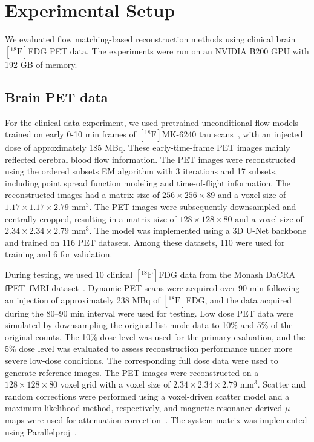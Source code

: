 \documentclass[journal]{IEEEtran}
\begin{document}
\section{Experimental Setup}

We evaluated flow matching-based reconstruction methods using clinical brain $[^{18}\mathrm{F}]$FDG PET data. The experiments were run on an NVIDIA B200 GPU with 192 GB of memory.

\subsection{Brain PET data}
For the clinical data experiment, we used pretrained unconditional flow models trained on early 0-10 min frames of $[^{18}\mathrm{F}]$MK-6240 tau scans~\cite{Gong2024DDPM}, with an injected dose of approximately 185 MBq. These early-time-frame PET images mainly reflected cerebral blood flow information. The PET images were reconstructed using the ordered subsets EM algorithm with 3 iterations and 17 subsets, including point spread function modeling and time-of-flight information. The reconstructed images had a matrix size of $256 \times 256 \times 89$ and a voxel size of $ 1.17  \times 1.17 \times 2.79 $ mm$^3$. The PET images were subsequently downsampled and centrally cropped, resulting in a matrix size of $128 \times 128 \times 80$ and a voxel size of $2.34 \times 2.34 \times 2.79$ mm$^3$. The model was implemented using a 3D U-Net backbone and trained on 116 PET datasets. Among these datasets, 110 were used for training and 6 for validation.

During testing, we used 10 clinical $[^{18}\mathrm{F}]$FDG data from the Monash DaCRA fPET--fMRI dataset~\cite{Jamadar2022}. Dynamic PET scans were acquired over 90 min following an injection of approximately 238 MBq of $[^{18}\mathrm{F}]$FDG, and the data acquired during the 80--90 min interval were used for testing. Low dose PET data were simulated by downsampling the original list-mode data to 10\% and 5\% of the original counts. The 10\% dose level was used for the primary evaluation, and the 5\% dose level was evaluated to assess reconstruction performance under more severe low-dose conditions. The corresponding full dose data were used to generate reference images. The PET images were reconstructed on a $128\times128\times80$ voxel grid with a voxel size of $2.34\times2.34\times2.79$ mm$^3$. Scatter and random corrections were performed using a voxel-driven scatter model and a maximum-likelihood method, respectively, and magnetic resonance-derived $\mu$ maps were used for attenuation correction~\cite{Markiewicz2018}. The system matrix was implemented using Parallelproj~\cite{Schramm2024}.
\end{document}
